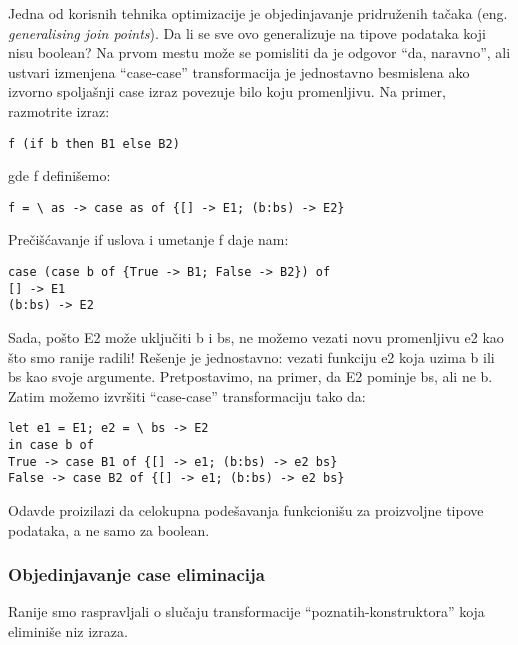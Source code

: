 Jedna od korisnih tehnika optimizacije je objedinjavanje pridruženih tačaka (eng. \emph{generalising join points}). Da li se sve ovo generalizuje na tipove podataka koji nisu boolean? Na prvom mestu može se pomisliti da je odgovor “da, naravno”, ali ustvari izmenjena “case-case” transformacija je jednostavno besmislena ako izvorno spoljašnji case izraz povezuje bilo koju promenljivu. Na primer, razmotrite izraz:
\begin{verbatim}
f (if b then B1 else B2)
\end{verbatim}
gde f definišemo:
\begin{verbatim}
f = \ as -> case as of {[] -> E1; (b:bs) -> E2}
\end{verbatim}
Prečišćavanje if uslova i umetanje f daje nam:
\begin{verbatim}
case (case b of {True -> B1; False -> B2}) of
[] -> E1
(b:bs) -> E2
\end{verbatim}
Sada, pošto E2 može uključiti b i bs, ne možemo vezati novu promenljivu e2 kao što smo ranije radili! Rešenje je jednostavno: vezati funkciju e2 koja uzima b ili bs kao svoje argumente. Pretpostavimo, na primer, da E2 pominje bs, ali ne b. Zatim možemo izvršiti “case-case” transformaciju tako da:
\begin{verbatim}
let e1 = E1; e2 = \ bs -> E2
in case b of
True -> case B1 of {[] -> e1; (b:bs) -> e2 bs}
False -> case B2 of {[] -> e1; (b:bs) -> e2 bs}
\end{verbatim}

Odavde proizilazi da celokupna podešavanja funkcionišu za proizvoljne tipove podataka, a ne samo za boolean.

\subsubsection{Objedinjavanje case eliminacija}

Ranije smo raspravljali o slučaju transformacije “poznatih-konstruktora” koja eliminiše niz izraza. 

